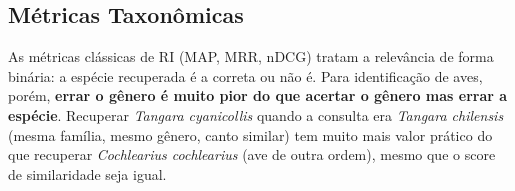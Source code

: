 \documentclass[12pt]{article}
\begin{document}





\subsection{Métricas Taxonômicas}
\label{sub:tax_fund}

As métricas clássicas de RI (MAP, MRR, nDCG) tratam a relevância de forma
binária: a espécie recuperada é a correta ou não é. Para identificação de
aves, porém, \textbf{errar o gênero é muito pior do que acertar o gênero mas
errar a espécie}. Recuperar \textit{Tangara cyanicollis} quando a consulta
era \textit{Tangara chilensis} (mesma família, mesmo gênero, canto similar)
tem muito mais valor prático do que recuperar \textit{Cochlearius cochlearius}
(ave de outra ordem), mesmo que o score de similaridade seja igual.
\end{document}
